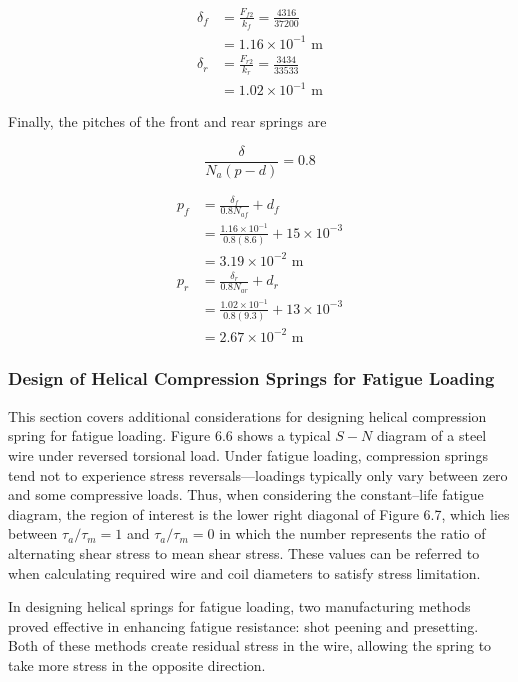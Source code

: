 \documentclass[a4paper,openany,nobib]{tufte-book}
\begin{document}
{{$$\begin{aligned}
    \delta_f &= \frac{F_{f2}}{k_f} = \frac{4316}{37200} \\
             &= 1.16 \times 10^{-1} \text{ m} \\
    \delta_r &= \frac{F_{r2}}{k_r} = \frac{3434}{33533} \\
             &= 1.02 \times 10^{-1} \text{ m}
  \end{aligned}$$

Finally, the pitches of the front and rear springs are

$$\frac{\delta}{N_a(p - d)} = 0.8$$

$$\begin{aligned}
    p_f &= \frac{\delta_f}{0.8N_{af}} + d_f \\ 
          &= \frac{1.16 \times 10^{-1}}{0.8(8.6)} + 15 \times 10^{-3} \\ 
          &= 3.19 \times 10^{-2} \text{ m} \\
    p_r &= \frac{\delta_r}{0.8N_{ar}} + d_r \\ 
          &= \frac{1.02 \times 10^{-1}}{0.8(9.3)} + 13 \times 10^{-3} \\ 
          &= 2.67 \times 10^{-2} \text{ m}
  \end{aligned}$$

\subsubsection{Design of Helical Compression Springs for Fatigue Loading}
\label{design-of-helical-compression-springs-for-fatigue-loading}
This section covers additional considerations for designing helical
compression spring for fatigue loading. Figure 6.6 shows a typical \(S-N\)
diagram of a steel wire under reversed torsional load. Under fatigue
loading, compression springs tend not to experience stress
reversals---loadings typically only vary between zero and some
compressive loads. Thus, when considering the constant--life fatigue
diagram, the region of interest is the lower right diagonal of Figure
6.7, which lies between \(\tau_a / \tau_m = 1\) and \(\tau_a / \tau_m = 0\)
in which the number represents the ratio of alternating shear stress to
mean shear stress. These values can be referred to when calculating
required wire and coil diameters to satisfy stress limitation.

In designing helical springs for fatigue loading, two manufacturing
methods proved effective in enhancing fatigue resistance: shot peening
and presetting. Both of these methods create residual stress in the
wire, allowing the spring to take more stress in the opposite direction.

}}
\end{document}
